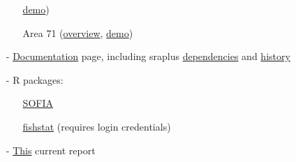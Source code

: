 \documentclass[12pt]{article}
\newcommand\blue[1]{\textcolor{darkblue}{#1}}
\newcommand\sofialink[2]{\blue{\href{https://github.com/sofia-taf/#1}{\sf #2}}}
\begin{document}
\begin{itemize}
\begin{itemize}
    \sofialink{doc/blob/main/presentations/area_57/demo.pdf}{demo})\\[-4ex]
    \item[] Area 71
    (\sofialink{doc/blob/main/presentations/area_71/overview.pdf}{overview},
    \sofialink{doc/blob/main/presentations/area_71/demo.pdf}{demo})\\[-3ex]
  \end{itemize}
  \item[-] \sofialink{doc}{Documentation} page, including sraplus
  \sofialink{doc/blob/main/sraplus_dependencies.md}{dependencies} and
  \sofialink{doc/blob/main/sraplus_history.md}{history}\\[-3ex]
  \item[-] R packages:
  \begin{itemize}
    \item[] \sofialink{SOFIA}{SOFIA}\\[-4ex]
    \item[] \sofialink{fishstat}{fishstat} (requires login credentials)\\[-3ex]
  \end{itemize}
  \item[-] \blue{\href{https://arni-magnusson.github.io/pdf/2023-sofia-taf.pdf}
    {{\sf This}}} current report
\end{itemize}
\end{document}
